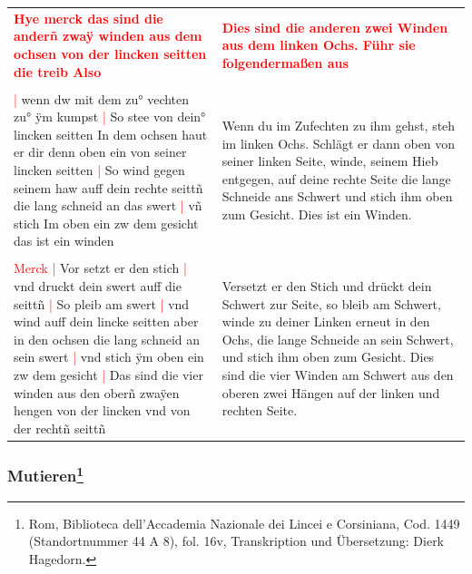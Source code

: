 \newpage

\begin{center}
\end{center}

\newpage

\begin{longtable}{p{6.25cm}p{6.25cm}}
    \textbf{\textcolor{red}{
        Hye merck das sind die anderñ zwaÿ winden aus dem ochsen von der lincken seitten die treib Also}}
    &
    \textbf{\textcolor{red}{
        Dies sind die anderen zwei Winden aus dem linken Ochs. Führ sie folgendermaßen aus}}
    \\
    \\
    \textcolor{red}{|} wenn dw mit dem zu° vechten zu° ÿm kumpst
    \textcolor{red}{|} So stee von dein° lincken seitten In dem ochsen haut er dir denn oben ein von seiner lincken seitten
    \textcolor{red}{|} So wind gegen seinem haw auff dein rechte seittñ die lang schneid an das swert
    \textcolor{red}{|} vñ stich Im oben ein zw dem gesicht das ist ein winden
    &
    Wenn du im Zufechten zu ihm gehst, steh im linken Ochs.
    Schlägt er dann oben von seiner linken Seite, winde, seinem Hieb entgegen, auf deine rechte Seite die lange Schneide ans Schwert und stich ihm oben zum Gesicht.
    Dies ist ein Winden.
    \\
    \\
    \textcolor{red}{Merck}
    \textcolor{red}{|} Vor setzt er den stich
    \textcolor{red}{|} vnd druckt dein swert auff die seittñ
    \textcolor{red}{|} So pleib am swert
    \textcolor{red}{|} vnd wind auff dein lincke seitten aber in den ochsen die lang schneid an sein swert
    \textcolor{red}{|} vnd stich ÿm oben ein zw dem gesicht
    \textcolor{red}{|} Das sind die vier winden aus den oberñ zwaÿen hengen von der lincken vnd von der rechtñ seittñ
    &
    Versetzt er den Stich und drückt dein Schwert zur Seite, so bleib am Schwert, winde zu deiner Linken erneut in den Ochs, die lange Schneide an sein Schwert, und stich ihm oben zum Gesicht.
    Dies sind die vier Winden am Schwert aus den oberen zwei Hängen auf der linken und rechten Seite.
\end{longtable}

\newpage

\begin{center}
\end{center}

\newpage

\subsubsection[Mutieren]{
    Mutieren\footnote{
        \hspace*{0.5ex}Rom, Biblioteca dell'Accademia Nazionale dei Lincei e Corsiniana,
        Cod. 1449 (Standortnummer 44 A 8), fol. 16v, Transkription und Übersetzung: Dierk Hagedorn.}}


